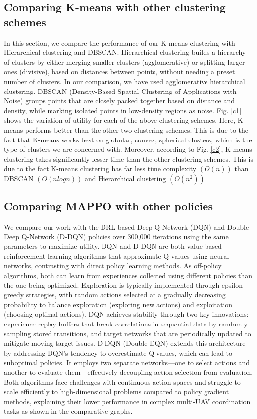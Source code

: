 \documentclass[conference]{IEEEtran}
\begin{document}
\subsection{Comparing K-means with other clustering schemes}
In this section, we compare the performance of our K-means clustering with Hierarchical clustering and DBSCAN. Hierarchical clustering builds a hierarchy of clusters by either merging smaller clusters (agglomerative) or splitting larger ones (divisive), based on distances between points, without needing a preset number of clusters. In our comparison, we have used agglomerative hierarchical clustering. DBSCAN (Density-Based Spatial Clustering of Applications with Noise) groups points that are closely packed together based on distance and density, while marking isolated points in low-density regions as noise. Fig. {\ref{c1}} shows the variation of utility for each of the above clustering schemes. Here, K-means performs better than the other two clustering schemes. This is due to the fact that K-means works best on globular, convex, spherical clusters, which is the type of clusters we are concerned with. Moreover, according to Fig. {\ref{c2}}, K-means clustering takes significantly lesser time than the other clustering schemes. This is due to the fact K-means clustering has far less time complexity $(O(n))$ than DBSCAN $(O(nlogn))$ and Hierarchical clustering $(O(n^2))$.

\subsection{Comparing MAPPO with other policies}
We compare our work with the DRL-based Deep Q-Network (DQN) and Double Deep Q-Network (D-DQN) policies over 300,000 iterations using the same parameters to maximize utility. DQN and D-DQN are both value-based reinforcement learning algorithms that approximate Q-values using neural networks, contrasting with direct policy learning methods. As off-policy algorithms, both can learn from experiences collected using different policies than the one being optimized. Exploration is typically implemented through epsilon-greedy strategies, with random actions selected at a gradually decreasing probability to balance exploration (exploring new actions) and exploitation (choosing optimal actions). DQN achieves stability through two key innovations: experience replay buffers that break correlations in sequential data by randomly sampling stored transitions, and target networks that are periodically updated to mitigate moving target issues. D-DQN (Double DQN) extends this architecture by addressing DQN's tendency to overestimate Q-values, which can lead to suboptimal policies. It employs two separate networks—one to select actions and another to evaluate them—effectively decoupling action selection from evaluation. Both algorithms face challenges with continuous action spaces and struggle to scale efficiently to high-dimensional problems compared to policy gradient methods, explaining their lower performance in complex multi-UAV coordination tasks as shown in the comparative graphs.
\end{document}
